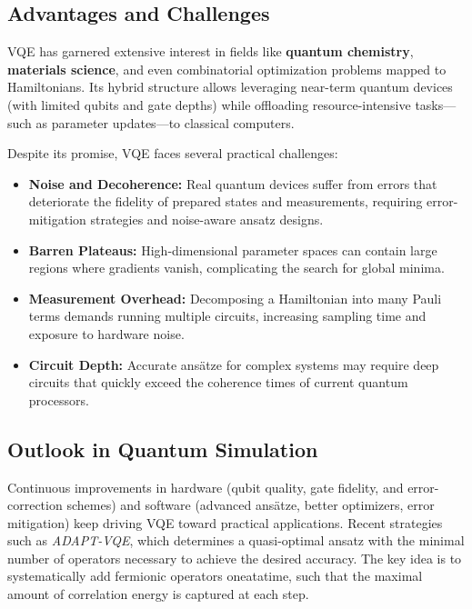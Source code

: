 \subsection{Advantages and Challenges}
\label{subsec:vqe_challenges}

VQE has garnered extensive interest in fields like \textbf{quantum chemistry}, \textbf{materials science}, and even combinatorial optimization problems mapped to Hamiltonians. Its hybrid structure allows leveraging near-term quantum devices (with limited qubits and gate depths) while offloading resource-intensive tasks---such as parameter updates---to classical computers. 

Despite its promise, VQE faces several practical challenges:

\begin{itemize}
    \item \textbf{Noise and Decoherence:} 
    Real quantum devices suffer from errors that deteriorate the fidelity of prepared states and measurements, requiring error-mitigation strategies and noise-aware ansatz designs.

    \item \textbf{Barren Plateaus:}
    High-dimensional parameter spaces can contain large regions where gradients vanish, complicating the search for global minima.

    \item \textbf{Measurement Overhead:}
    Decomposing a Hamiltonian into many Pauli terms demands running multiple circuits, increasing sampling time and exposure to hardware noise.

    \item \textbf{Circuit Depth:}
    Accurate ans\"atze for complex systems may require deep circuits that quickly exceed the coherence times of current quantum processors.
\end{itemize}

\subsection{Outlook in Quantum Simulation}
\label{subsec:vqe_outlook}

Continuous improvements in hardware (qubit quality, gate fidelity, and error-correction schemes) and software (advanced ans\"atze, better optimizers, error mitigation) keep driving VQE toward practical applications. Recent strategies such as \emph{ADAPT-VQE}\cite{ADAPTVQE}, which determines a quasi-optimal ansatz with the minimal number of operators necessary to achieve the desired accuracy. The key idea is to systematically add fermionic operators one\-at\-a\-time, such that the maximal amount of correlation energy is captured at each step.


